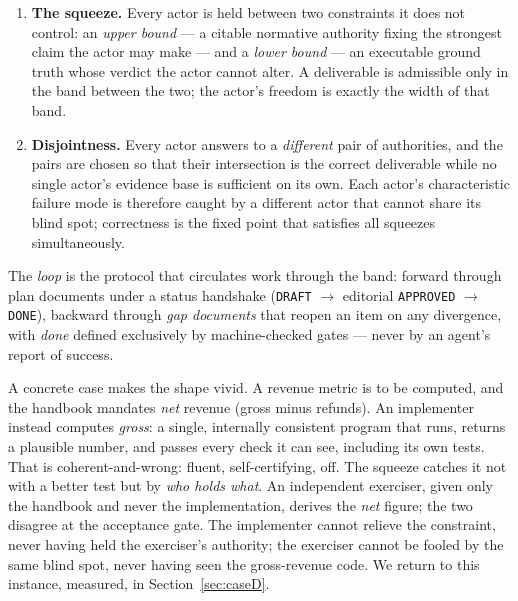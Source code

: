 \documentclass[11pt]{article}
\newcommand{\code}[1]{\texttt{#1}}
\begin{document}
\begin{enumerate}
\item \textbf{The squeeze.} Every actor is held between two constraints it
  does not control: an \emph{upper bound} --- a citable normative authority
  fixing the strongest claim the actor may make --- and a \emph{lower bound}
  --- an executable ground truth whose verdict the actor cannot alter. A
  deliverable is admissible only in the band between the two; the actor's
  freedom is exactly the width of that band.
\item \textbf{Disjointness.} Every actor answers to a \emph{different} pair of
  authorities, and the pairs are chosen so that their intersection is the
  correct deliverable while no single actor's evidence base is sufficient on
  its own. Each actor's characteristic failure mode is therefore caught by a
  different actor that cannot share its blind spot; correctness is the fixed
  point that satisfies all squeezes simultaneously.
\end{enumerate}

The \emph{loop} is the protocol that circulates work through the band: forward
through plan documents under a status handshake
(\code{DRAFT} $\rightarrow$ editorial \code{APPROVED} $\rightarrow$
\code{DONE}), backward through \emph{gap documents} that reopen an item on any
divergence, with \emph{done} defined exclusively by machine-checked gates ---
never by an agent's report of success.

A concrete case makes the shape vivid. A revenue metric is to be computed, and the
handbook mandates \emph{net} revenue (gross minus refunds). An implementer instead
computes \emph{gross}: a single, internally consistent program that runs, returns a
plausible number, and passes every check it can see, including its own tests. That is
coherent-and-wrong: fluent, self-certifying, off. The squeeze catches it not with a
better test but by \emph{who holds what}. An independent exerciser, given only the
handbook and never the implementation, derives the \emph{net} figure; the two disagree
at the acceptance gate. The implementer cannot relieve the constraint, never having held
the exerciser's authority; the exerciser cannot be fooled by the same blind spot, never
having seen the gross-revenue code. We return to this instance, measured, in
Section~\ref{sec:caseD}.
\end{document}
